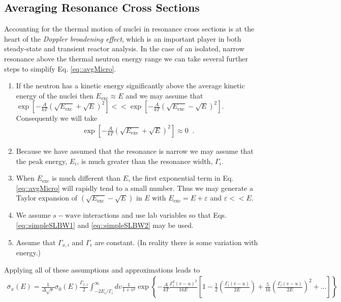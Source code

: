 \documentclass[11pt]{article}
\begin{document}
\subsection{Averaging Resonance Cross Sections}
\label{sec:orgheadline7}
Accounting for the thermal motion of nuclei in resonance cross sections is at the heart of the \emph{Doppler broadening effect}, which is an important player in both steady-state and transient reactor analysis.  In the case of an isolated, narrow resonance above the thermal neutron energy range we can take several further steps to simplify Eq. \eqref{eq::avgMicro}.
\begin{enumerate}
\item If the neutron has a kinetic energy significantly above the average kinetic energy of the nuclei then \(E_\text{exc} \approx E\) and we may assume that \(\exp\left[-\frac{A}{kT}\left(\sqrt{E_\text{exc}} + \sqrt{E}\right)^2\right] << \exp\left[-\frac{A}{kT}\left(\sqrt{E_\text{exc}} - \sqrt{E}\right)^2\right]\).  Consequently we will take
\begin{align}
  \exp\left[-\frac{A}{kT}\left(\sqrt{E_\text{exc}} + \sqrt{E}\right)^2\right] \approx 0 \;\;.
\end{align}
\item Because we have assumed that the resonance is narrow we may assume that the peak energy, \(E_i\), is much greater than the resonance width, \(\Gamma_i\).
\item When \(E_\text{exc}\) is much different than \(E\), the first exponential term in Eq. \eqref{eq::avgMicro} will rapidly tend to a small number.  Thus we may generate a Taylor expansion of \(\left(\sqrt{E_\text{exc}} - \sqrt{E}\right)\) in \(E\) with \(E_\text{exc} = E + \varepsilon\) and \(\varepsilon << E\).
\item We assume \(s-\text{wave}\) interactions and use lab variables so that Eqs. \eqref{eq::simpleSLBW1} and \eqref{eq::simpleSLBW2} may be used.
\item Assume that \(\Gamma_{x,i}\) and \(\Gamma_i\) are constant.  (In reality there is some variation with energy.)
\end{enumerate}
Applying all of these assumptions and approximations leads to
\begin{align}
  \label{eq::dopplerSLBWx}
  \bar{\sigma}_x(E) = \frac{1}{\Delta \sqrt{\pi}} \sigma_0(E) \frac{\Gamma_{x,i}}{2}
                      \int_{-2E_i/\Gamma_i}^\infty dv \frac{1}{1+v^2}
                      \exp\left\{ -\frac{A}{kT} \frac{\Gamma_i^2(v-u)^2}{16E}
                                  \left[ 1 - \frac{1}{2}\left( \frac{\Gamma_i(v-u)}{2E} \right)
                                           + \frac{5}{16}\left( \frac{\Gamma_i(v-u)}{2E} \right)^2 + \hdots \right] \right\}
\end{align}
\end{document}
